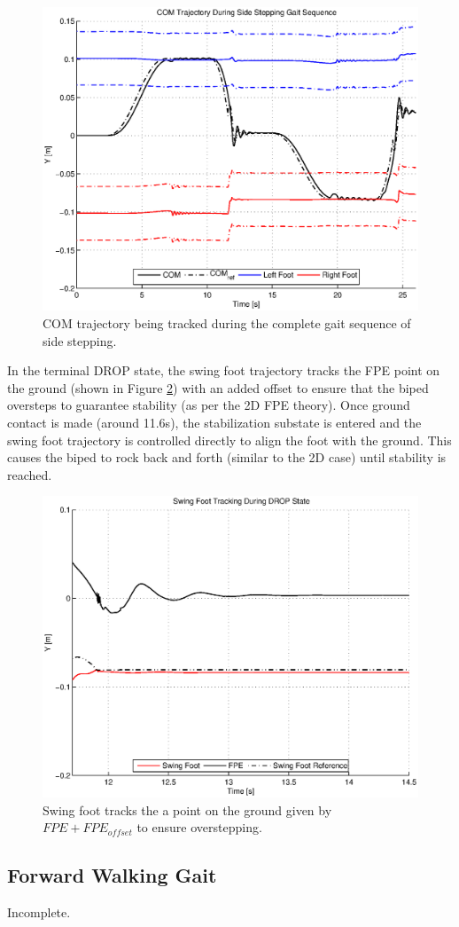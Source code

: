 \begin{figure}[!h]
	\centering
    \includegraphics[scale=0.8]{fig/simulations/comtraj.eps}
  	\caption{COM trajectory being tracked during the complete gait sequence of side stepping.}
	\label{fig:comtraj}
\end{figure}


In the terminal DROP state, the swing foot trajectory tracks the FPE point on the ground (shown in Figure \ref{fig:fpetrack}) with an added offset to ensure that the biped oversteps to guarantee stability (as per the 2D FPE theory). Once ground contact is made (around 11.6s), the stabilization substate is entered and the swing foot trajectory is controlled directly to align the foot with the ground. This causes the biped to rock back and forth (similar to the 2D case) until stability is reached.

\begin{figure}[!h]
	\centering
    \includegraphics[scale=0.8]{fig/simulations/fpetrack.eps}
  	\caption{Swing foot tracks the a point on the ground given by $FPE + FPE_{offset}$ to ensure overstepping.}
	\label{fig:fpetrack}
\end{figure}


\subsection{Forward Walking Gait} %
\label{sub:forward_walking_gait}
Incomplete. 



